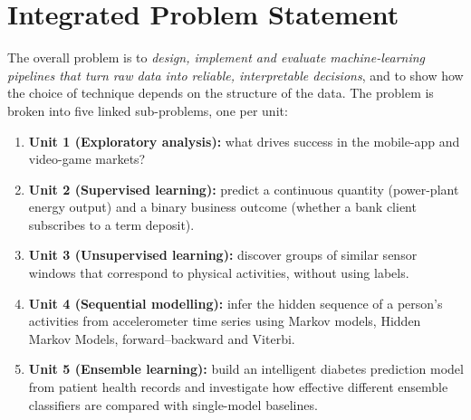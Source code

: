 \section{Integrated Problem Statement}
The overall problem is to \emph{design, implement and evaluate machine-learning pipelines that turn raw data into reliable,
interpretable decisions}, and to show how the choice of technique depends on the structure of the data. The problem is
broken into five linked sub-problems, one per unit:
\begin{enumerate}
\item \textbf{Unit 1 (Exploratory analysis):} what drives success in the mobile-app and video-game markets?
\item \textbf{Unit 2 (Supervised learning):} predict a continuous quantity (power-plant energy output) and a binary
business outcome (whether a bank client subscribes to a term deposit).
\item \textbf{Unit 3 (Unsupervised learning):} discover groups of similar sensor windows that correspond to physical
activities, without using labels.
\item \textbf{Unit 4 (Sequential modelling):} infer the hidden sequence of a person's activities from accelerometer time
series using Markov models, Hidden Markov Models, forward–backward and Viterbi.
\item \textbf{Unit 5 (Ensemble learning):} build an intelligent diabetes prediction model from patient health records and
investigate how effective different ensemble classifiers are compared with single-model baselines.
\end{enumerate}

